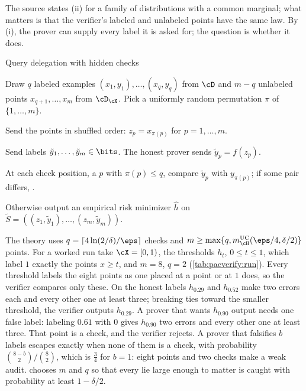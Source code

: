 \begin{refsection}
The source states (ii) for a family of distributions with a common marginal; what matters is that the verifier's labeled and unlabeled points have the same law. By (i), the prover can supply every label it is asked for; the question is whether it does.

\begin{protocol}{Query delegation with hidden checks}\label{prot:pacverify:delegation}
\item[\act{V}] Draw $q$ labeled examples $(x_1,y_1),\dots,(x_q,y_q)$ from $\cD$ and $m-q$ unlabeled points $x_{q+1},\dots,x_m$ from $\cD_\cX$. Pick a uniformly random permutation $\pi$ of $\{1,\dots,m\}$.
\item[\msg{V}{P}] Send the points in shuffled order: $z_p=x_{\pi(p)}$ for $p=1,\dots,m$.
\item[\msg{P}{V}] Send labels $\tilde y_1,\dots,\tilde y_m\in\bits$. The honest prover sends $\tilde y_p=f(z_p)$.
\item[\act{V}] At each check position, a $p$ with $\pi(p)\le q$, compare $\tilde y_p$ with $y_{\pi(p)}$; if some pair differs, \rej.
\item[\act{V}] Otherwise output an empirical risk minimizer $\hat h$ on $\tilde S=((z_1,\tilde y_1),\dots,(z_m,\tilde y_m))$.
\end{protocol}

The theory uses $q=\lceil4\ln(2/\delta)/\eps\rceil$ checks and $m\ge\max\{q,\pacverifyuc(\eps/4,\delta/2)\}$ points. For a worked run take $\cX=[0,1)$, the thresholds $h_t$, $0\le t\le1$, which label $1$ exactly the points $x\ge t$, and $m=8$, $q=2$ (\cref{tab:pacverify:run}). Every threshold labels the eight points as one placed at a point or at $1$ does, so the verifier compares only these. On the honest labels $h_{0.29}$ and $h_{0.52}$ make two errors each and every other one at least three; breaking ties toward the smaller threshold, the verifier outputs $h_{0.29}$. A prover that wants $h_{0.90}$ output needs one false label: labeling $0.61$ with $0$ gives $h_{0.90}$ two errors and every other one at least three. That point is a check, and the verifier rejects. A prover that falsifies $b$ labels escapes exactly when none of them is a check, with probability $\binom{8-b}{2}/\binom82$, which is $\frac34$ for $b=1$: eight points and two checks make a weak audit.  chooses $m$ and $q$ so that every lie large enough to matter is caught with probability at least $1-\delta/2$.


\end{refsection}
